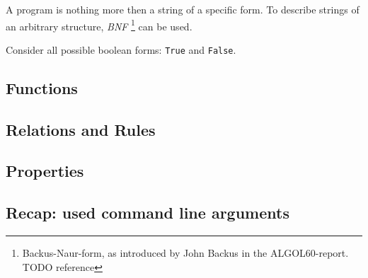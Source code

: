 A program is nothing more then a string of a specific form. To describe
strings of an arbitrary structure, \emph{BNF} \footnote{Backus-Naur-form,
  as introduced by John Backus in the ALGOL60-report. TODO reference}
can be used.

Consider all possible boolean forms: \texttt{True} and \texttt{False}.

\subsection{Functions}\label{functions}

\subsection{Relations and Rules}\label{relations-and-rules}

\subsection{Properties}\label{properties}

\subsection{Recap: used command line
arguments}\label{recap-used-command-line-arguments}
